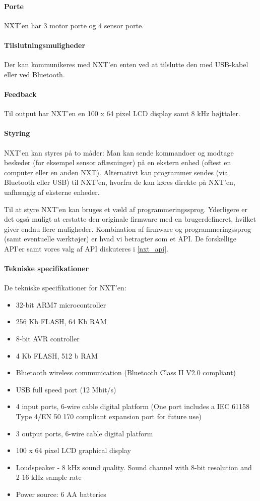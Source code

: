 \paragraph{Porte}
NXT'en har 3 motor porte og 4 sensor porte.

\paragraph{Tilslutningsmuligheder}
Der kan kommunikeres med NXT'en enten ved at tilslutte den med USB-kabel eller ved Bluetooth\textregistered.

\paragraph{Feedback}
Til output har NXT'en en 100 x 64 pixel LCD display samt 8 kHz højttaler.

\paragraph{Styring}
NXT'en kan styres på to måder:
Man kan sende kommandoer og modtage beskeder (for eksempel sensor aflæsninger) på en ekstern enhed (oftest en computer eller en anden NXT).
Alternativt kan programmer sendes (via Bluetooth eller USB) til NXT'en, hvorfra de kan køres direkte på NXT'en, uafhængig af eksterne enheder.

Til at styre NXT'en kan bruges et væld af programmeringssprog.
Yderligere er det også muligt at erstatte den originale firmware med en brugerdefineret, hvilket giver endnu flere muligheder.
Kombination af firmware og programmeringssprog (samt eventuelle værktøjer) er hvad vi betragter som et API.
De forskellige API'er samt vores valg af API diskuteres i \cref{nxt_api}.

\paragraph{Tekniske specifikationer}
De tekniske specifikationer for NXT'en:\cite{nxt}
\begin{itemize}
\item{32-bit ARM7 microcontroller}
\item{256 Kb FLASH, 64 Kb RAM}
\item{8-bit AVR controller}
\item{4 Kb FLASH, 512 b RAM}
\item{Bluetooth wireless communication (Bluetooth Class II V2.0 compliant)}
\item{USB full speed port (12 Mbit/s)}
\item{4 input ports, 6-wire cable digital platform (One port includes a IEC 61158 Type 4/EN 50 170 compliant expansion port for future use)}
\item{3 output ports, 6-wire cable digital platform}
\item{100 x 64 pixel LCD graphical display}
\item{Loudspeaker - 8 kHz sound quality. Sound channel with 8-bit resolution and 2-16 kHz sample rate}
\item{Power source: 6 AA batteries}
\end{itemize}

